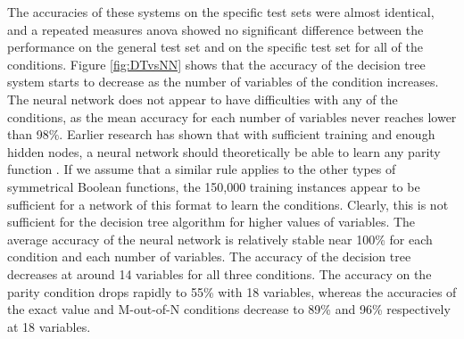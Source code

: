 \documentclass[letterpaper]{article} %
\begin{document}
The accuracies of these systems on the specific test sets were almost identical, and a repeated measures anova showed no significant difference between the performance on the general test set and on the specific test set for all of the conditions. Figure \ref{fig:DTvsNN} shows that the accuracy of the decision tree system starts to decrease as the number of variables of the condition increases. The neural network does not appear to have difficulties with any of the conditions, as the mean accuracy for each number of variables never reaches lower than 98\%. Earlier research has shown that with sufficient training and enough hidden nodes, a neural network should theoretically be able to learn any parity function \cite{wilamowski2003solving}. If we assume that a similar rule applies to the other types of symmetrical Boolean functions, the 150,000 training instances appear to be sufficient for a network of this format to learn the conditions. Clearly, this is not sufficient for the decision tree algorithm for higher values of variables. The average accuracy of the neural network is relatively stable near 100\% for each condition and each number of variables. The accuracy of the decision tree decreases at around 14 variables for all three conditions. The accuracy on the parity condition drops rapidly to 55\% with 18 variables, whereas the accuracies of the exact value and M-out-of-N conditions decrease to 89\% and 96\% respectively at 18 variables. 

\end{document}
